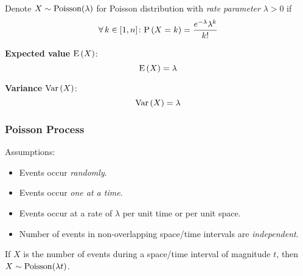 Denote $X \sim \mathrm{Poisson}(\lambda)$ for Poisson distribution with \textit{rate parameter} $\lambda > 0$ if
\begin{equation*}
    \operatorname{\forall} k \in [1, n] \colon \mathrm{P} \left( X = k \right) = \frac{ e^{-\lambda} \lambda^k }{ k! }
\end{equation*}

\textbf{Expected value} $\mathrm{E} \left( X \right)$:
\begin{equation*}
    \mathrm{E} \left( X \right) = \lambda
\end{equation*}

\textbf{Variance} $\mathrm{Var} \left( X \right)$:
\begin{equation*}
    \mathrm{Var} \left( X \right) = \lambda
\end{equation*}

\subsubsection*{Poisson Process}

Assumptions:
\begin{itemize}
    \item Events occur \textit{randomly}.
    \item Events occur \textit{one at a time}.
    \item Events occur at a rate of $\lambda$ per unit time or per unit space.
    \item Number of events in non-overlapping space/time intervals are \textit{independent}.
\end{itemize}

If $X$ is the number of events during a space/time interval of magnitude $t$, then $X \sim \mathrm{Poisson}( \lambda t )$.
